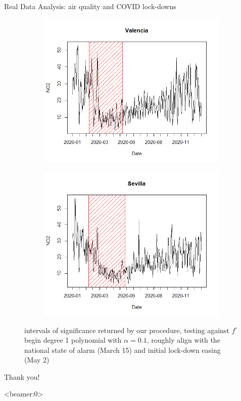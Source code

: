 \documentclass{beamer}
\begin{document}
\begin{frame}{Real Data Analysis: air quality and COVID lock-downs}
{\begin{figure}
\begin{subfigure}[b]{0.3\textwidth}
    \centering
    \includegraphics[width=\textwidth]{../plots/Valencia-2}
\end{subfigure}
\begin{subfigure}[b]{0.3\textwidth}
    \centering
    \includegraphics[width=\textwidth]{../plots/Sevilla-2}
\end{subfigure}
\caption{intervals of significance returned by our procedure, testing against $f^\circ$ begin degree 1 polynomial with $\alpha = 0.1$, roughly align with the national state of alarm (March 15) and initial lock-down easing (May 2)}
\end{figure}
}
\end{frame}

\begin{frame}
\centering
\huge{Thank you!}
\end{frame}

\begin{frame}<beamer:0>
    
\end{frame}
\end{document}
